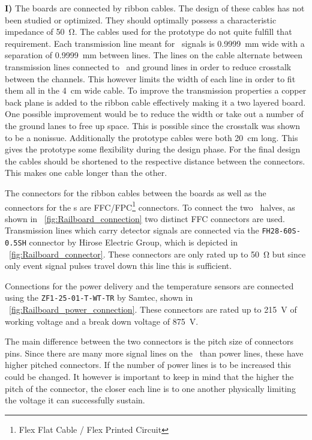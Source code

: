 \documentclass[../BTOF_summary.tex]{subfiles}
\begin{document}
\textbf{I)} 
The boards are connected by ribbon cables.
The design of these cables has not been studied or optimized.
They should optimally possess a characteristic impedance of \SI{50}{\ohm}.
The cables used for the prototype do not quite fulfill that requirement.
Each transmission line meant for \sipm\ signals is \SI{0.9999}{mm} wide with a separation of \SI{0.9999}{mm} between lines.
The lines on the cable alternate between transmission lines connected to \sipms\ and ground lines in order to reduce crosstalk between the channels.
This however limits the width of each line in order to fit them all in the \SI{4}{cm} wide cable.
To improve the transmission properties a copper back plane is added to the ribbon cable effectively making it a two layered board.
One possible improvement would be to reduce the width or take out a number of the ground lanes to free up space.
This is possible since the crosstalk was shown to be a nonissue.
Additionally the prototype cables were both \SI{20}{cm} long.
This gives the prototype some flexibility during the design phase.
For the final design the cables should be shortened to the respective distance between the connectors.
This makes one cable longer than the other.

The connectors for the ribbon cables between the boards as well as the connectors for the \sensorboard s are FFC/FPC\footnote{Flex Flat Cable / Flex Printed Circuit} connectors.
To connect the two \railboard\ halves, as shown in \fig ~\ref{fig:Railboard_connection} two distinct FFC connectors are used.
Transmission lines which carry detector signals are connected via the \texttt{FH28-60S-0.5SH} connector by Hirose Electric Group, which is depicted in \fig~\ref{fig:Railboard_connector}.
These connectors are only rated up to \SI{50}{\ohm} but since only event signal pulses travel down this line this is sufficient.

Connections for the power delivery and the temperature sensors are connected using the \texttt{ZF1-25-01-T-WT-TR} by Samtec, shown in \fig~\ref{fig:Railboard_power_connection}.
These connectors are rated up to \SI{215}{V} of working voltage and a break down voltage of \SI{875}{V}.

The main difference between the two connectors is the pitch size of connectors pins.
Since there are many more signal lines on the \railboard\ than power lines, these have higher pitched connectors.
If the number of power lines is to be increased this could be changed.
It however is important to keep in mind that the higher the pitch of the connector, the closer each line is to one another physically limiting the voltage it can successfully sustain.
\end{document}
